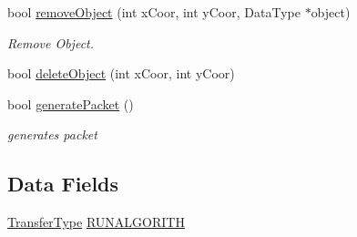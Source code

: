 \begin{DoxyCompactItemize}
bool \hyperlink{class_world_a6ece0e52d09aae5aaea04eec740d8f07}{remove\+Object} (int x\+Coor, int y\+Coor, Data\+Type $\ast$object)
\begin{DoxyCompactList}\small\item\em Remove Object. \end{DoxyCompactList}\item 
bool \hyperlink{class_world_ac81c2e5154a59fa6545825aa55905619}{delete\+Object} (int x\+Coor, int y\+Coor)
\item 
bool \hyperlink{class_world_a7e002b7995e953afa970359503f42f5d}{generate\+Packet} ()
\begin{DoxyCompactList}\small\item\em generates packet \end{DoxyCompactList}\end{DoxyCompactItemize}
\subsection*{Data Fields}
\begin{DoxyCompactItemize}
\item 
\hyperlink{world_8h_ad47f1eda321bcca6916acde6b220d704}{Transfer\+Type} \hyperlink{class_world_a36829a35bff07a66a3742fa57a1b7e63}{R\+U\+N\+A\+L\+G\+O\+R\+I\+TH}
\end{DoxyCompactItemize}
